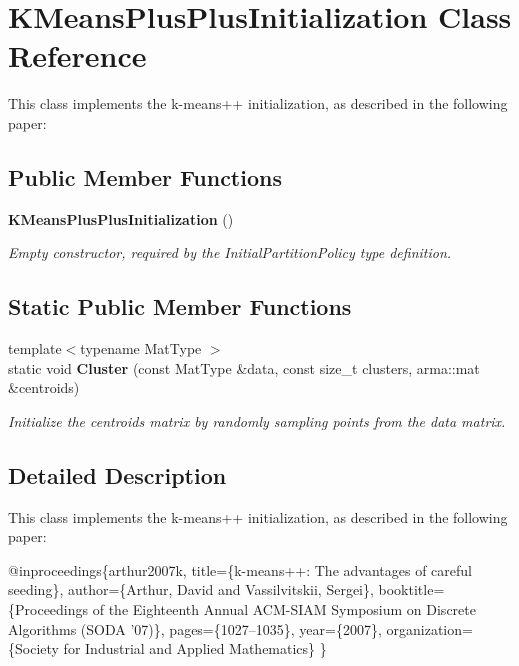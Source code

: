 \section{K\+Means\+Plus\+Plus\+Initialization Class Reference}
\label{classKMeansPlusPlusInitialization}


This class implements the k-\/means++ initialization, as described in the following paper\+:  


\subsection*{Public Member Functions}
\begin{DoxyCompactItemize}
\item 
\textbf{ K\+Means\+Plus\+Plus\+Initialization} ()
\begin{DoxyCompactList}\small\item\em Empty constructor, required by the Initial\+Partition\+Policy type definition. \end{DoxyCompactList}\end{DoxyCompactItemize}
\subsection*{Static Public Member Functions}
\begin{DoxyCompactItemize}
\item 
{\footnotesize template$<$typename Mat\+Type $>$ }\\static void \textbf{ Cluster} (const Mat\+Type \&data, const size\+\_\+t clusters, arma\+::mat \&centroids)
\begin{DoxyCompactList}\small\item\em Initialize the centroids matrix by randomly sampling points from the data matrix. \end{DoxyCompactList}\end{DoxyCompactItemize}


\subsection{Detailed Description}
This class implements the k-\/means++ initialization, as described in the following paper\+: 


\begin{DoxyCode}
@inproceedings\{arthur2007k,
  title=\{k-means++: The advantages of careful seeding\},
  author=\{Arthur, David and Vassilvitskii, Sergei\},
  booktitle=\{Proceedings of the Eighteenth Annual ACM-SIAM Symposium on
       Discrete Algorithms (SODA \textcolor{stringliteral}{'07)\},}
\textcolor{stringliteral}{  pages=\{1027--1035\},}
\textcolor{stringliteral}{  year=\{2007\},}
\textcolor{stringliteral}{  organization=\{Society for Industrial and Applied Mathematics\}}
\textcolor{stringliteral}{\}}
\end{DoxyCode}


